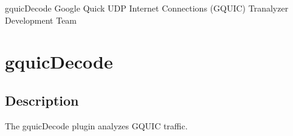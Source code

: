 \documentclass[documentation]{subfiles}
\begin{document}
\trantitle
    {gquicDecode} %
    {Google Quick UDP Internet Connections (GQUIC)} %
    {Tranalyzer Development Team} %

\section{gquicDecode}\label{s:gquicDecode}

\subsection{Description}
The gquicDecode plugin analyzes GQUIC traffic.




%
%
\end{document}
